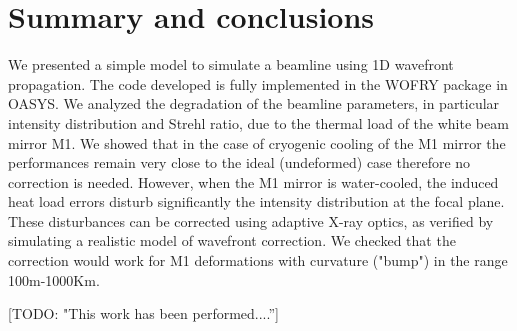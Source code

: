 \documentclass{iucr}              %
\newcommand{\todo}[1]{{\color{red}[TODO: "#1'']}}
\begin{document}
  

\section{Summary and conclusions}

We presented a simple model to simulate a beamline using 1D wavefront propagation. The code developed is fully implemented in the WOFRY package in OASYS.
We analyzed the degradation of the beamline parameters, in particular intensity distribution and Strehl ratio, due to the thermal load of the white beam mirror M1. We showed that in the case of cryogenic cooling of the M1 mirror the performances remain very close to the ideal (undeformed) case therefore no correction is needed. However, when the M1 mirror is water-cooled, the induced heat load errors disturb significantly the intensity distribution at the focal plane. These disturbances can be corrected using adaptive X-ray optics, as verified by simulating a realistic model of wavefront correction. We checked that the correction would work for M1 deformations with curvature ("bump") in the range 100m-1000Km. 


\acknowledgments %
 
\todo{This work has been performed....} 

\end{document}
